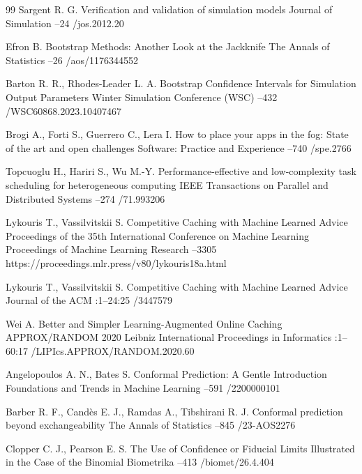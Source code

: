 \begin{thebibliography}{99}
\by Sargent R. G.
\paper Verification and validation of simulation models
\jour Journal of Simulation
--24
/jos.2012.20

\by Efron B.
\paper Bootstrap Methods: Another Look at the Jackknife
\jour The Annals of Statistics
--26
/aos/1176344552

\by Barton R. R., Rhodes-Leader L. A.
\paper Bootstrap Confidence Intervals for Simulation Output Parameters
 Winter Simulation Conference (WSC)
--432
/WSC60868.2023.10407467

\by Brogi A., Forti S., Guerrero C., Lera I.
\paper How to place your apps in the fog: State of the art and open challenges
\jour Software: Practice and Experience
--740
/spe.2766

\by Topcuoglu H., Hariri S., Wu M.-Y.
\paper Performance-effective and low-complexity task scheduling for heterogeneous computing
\jour IEEE Transactions on Parallel and Distributed Systems
--274
/71.993206

\by Lykouris T., Vassilvitskii S.
\paper Competitive Caching with Machine Learned Advice
\inbook Proceedings of the 35th International Conference on Machine Learning
\serial Proceedings of Machine Learning Research
--3305
\URL https://proceedings.mlr.press/v80/lykouris18a.html

\by Lykouris T., Vassilvitskii S.
\paper Competitive Caching with Machine Learned Advice
\jour Journal of the ACM
:1--24:25
/3447579

\by Wei A.
\paper Better and Simpler Learning-Augmented Online Caching
\inbook APPROX/RANDOM 2020
\serial Leibniz International Proceedings in Informatics
:1--60:17
/LIPIcs.APPROX/RANDOM.2020.60

\by Angelopoulos A. N., Bates S.
\paper Conformal Prediction: A Gentle Introduction
\jour Foundations and Trends in Machine Learning
--591
/2200000101

\by Barber R. F., Cand\`es E. J., Ramdas A., Tibshirani R. J.
\paper Conformal prediction beyond exchangeability
\jour The Annals of Statistics
--845
/23-AOS2276

\by Clopper C. J., Pearson E. S.
\paper The Use of Confidence or Fiducial Limits Illustrated in the Case of the Binomial
\jour Biometrika
--413
/biomet/26.4.404

\end{thebibliography}
